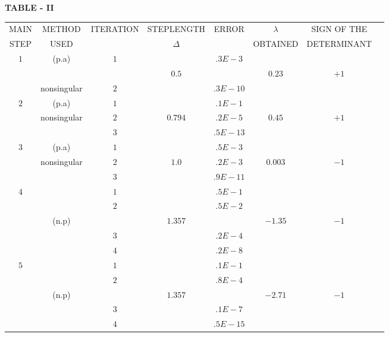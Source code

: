 {\fontsize{8}{10}\selectfont
\begin{center}
{\bf TABLE - II}\pageoriginale
\medskip
\renewcommand{\arraystretch}{2}
\tabcolsep=2pt
\begin{tabular}{cccccccc}
\hline
 MAIN  & METHOD & ITERATION & STEPLENGTH  &  ERROR & $\lambda$ & SIGN
 OF THE  \\ 
 STEP & USED & &  $\Delta$ & & OBTAINED & DETERMINANT\\
  \hline
 $1$ & (p.a) & $1$ & & .$3E-3$ \\ 
 &  & & $0.5$ & & $0.23$ & $+1$\\
  & nonsingular & $2$ & & .$3E-10$ & & \\
  \hline 
  $2$ & (p.a)  & $1$ & & .$1E-1$\\
  & nonsingular & $2$ & $0.794$ & .$2E-5$ & $0.45$ & $+1$\\
  & & $3$ & & .$5E-13$ \\
  \hline
  $3$ & (p.a) & $1$ & & .$5E-3$\\
  & nonsingular & $2$ & $1.0$ & .$2E-3$ & $0.003$ & $-1$\\
  & & $3$ & & .$9E-11$\\
  \hline 
  $4$ & & $1$  & & .$5E-1$\\
  & &  $2$ & & .$5E-2$\\
  &  (n.p) & &  $1.357$ & & $-1.35$  & $-1$\\
  & & $3$ &   & .$2E-4$ \\
  & &  $4$ & & .$2E-8$ \\
  \hline 
  $5$ & & $1$ & & .$1E-1$\\
  & & $2$ & & .$8E-4$ \\
  & (n.p) & & $1.357$  &  & $-2.71$ & $-1$\\
  & & $3$ & &  .$1E-7$\\
  & & $4$ & & .$5E-15$ \\         
\hline
  \end{tabular}
\end{center}}\relax

\vfill\eject

